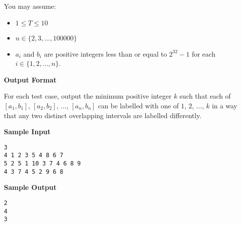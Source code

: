 You may assume:
\begin{itemize}
    \tightlist{}
    \item $1 \le T \le 10$
    \item $n\in \{2,3,\ldots,100000\}$
    \item $a_i$ and $b_i$ are positive integers less than or equal to $2^{32}-1$
          for each $i\in\{1,2,\ldots,n\}$.
\end{itemize}


\textbf{\large Output Format}

For each test case, output the minimum positive integer $k$ such that
each of
$[a_1,b_1]$, $[a_2,b_2]$, $\ldots$, $[a_n,b_n]$
can be
labelled with one of $1$, $2$, $\ldots$, $k$ in a way that any two
distinct overlapping
intervals are labelled differently.

\textbf{\large Sample Input}

\begin{verbatim}
3
4 1 2 3 5 4 8 6 7
5 2 5 1 10 3 7 4 6 8 9
4 3 7 4 5 2 9 6 8
\end{verbatim}

\textbf{\large Sample Output}

\begin{verbatim}
2
4
3
\end{verbatim}
